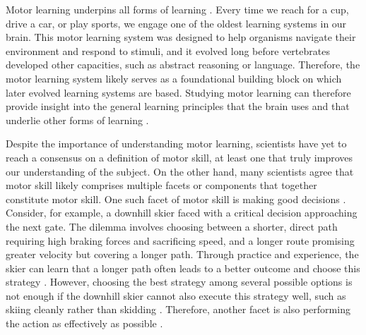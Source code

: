 Motor learning underpins all forms of learning \cite{shadmehr_computational_2004}. Every time we reach for a cup, drive a car, or play sports, we engage one of the oldest learning systems in our brain. This motor learning system was designed to help organisms navigate their environment and respond to stimuli, and it evolved long before vertebrates developed other capacities, such as abstract reasoning or language. Therefore, the motor learning system likely serves as a foundational building block on which later evolved learning systems are based. Studying motor learning can therefore provide insight into the general learning principles that the brain uses and that underlie other forms of learning \cite{shadmehr_computational_2004}.

Despite the importance of understanding motor learning, scientists have yet to reach a consensus on a definition of motor skill, at least one that truly improves our understanding of the subject\cite{du_relationship_2022, shadmehr_computational_2004}. On the other hand, many scientists agree that motor skill likely comprises multiple facets or components that together constitute motor skill\cite{wolpert_principles_2011, wolpert_motor_2010, wolpert_perspectives_2001, du_relationship_2022, chen_effects_2018, diedrichsen_motor_2015, stanley_motor_2013, gallivan_decision-making_2018, krakauer_motor_2019, makino_circuit_2016}. One such facet of motor skill is making good decisions \cite{gallivan_decision-making_2018, du_relationship_2022, wolpert_motor_2010}. Consider, for example, a downhill skier faced with a critical decision approaching the next gate. The dilemma involves choosing between a shorter, direct path requiring high braking forces and sacrificing speed, and a longer route promising greater velocity but covering a longer path. Through practice and experience, the skier can learn that a longer path often leads to a better outcome and choose this strategy \cite{supej_differential_2008, lesnik_best_2007, federolf_quantifying_2012}. However, choosing the best strategy among several possible options is not enough if the downhill skier cannot also execute this strategy well, such as skiing cleanly rather than skidding \cite{reid_kinematic_2010, reid_turn_2009}. Therefore, another facet is also performing the action as effectively as possible \cite{du_relationship_2022, wolpert_perspectives_2001}.

